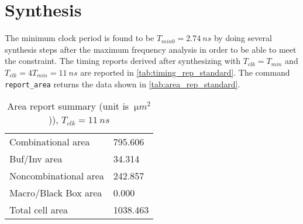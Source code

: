 \chapter{Synthesis}
The minimum clock period is found to be $T_{min0}=\SI{2.74}{ns}$ by doing several synthesis steps after the maximum frequency analysis in order to be able to meet the constraint. The timing reports derived after synthesizing with $T_{clk}=T_{min}$ and $T_{clk}=4T_{min}=\SI{11}{ns}$ are reported in \autoref{tab:timing_rep_standard}.
The command \texttt{report\_area} returns the data shown in \autoref{tab:area_rep_standard}.

\begin{table}[htbp]
	\centering
	\begin{tabular}{|l|l|}\hline
		Combinational area&                795.606\\
		Buf/Inv area&                       34.314\\
		Noncombinational area&             242.857\\
		Macro/Black Box area&                0.000\\
		Total cell area&                  1038.463\\\hline
		\end{tabular}
	\caption{Area report summary (unit is $\SI{}{\micro m ^2}$)), $T_{clk} = \SI{11}{ns}$}
	\label{tab:area_rep_standard}
\end{table}




